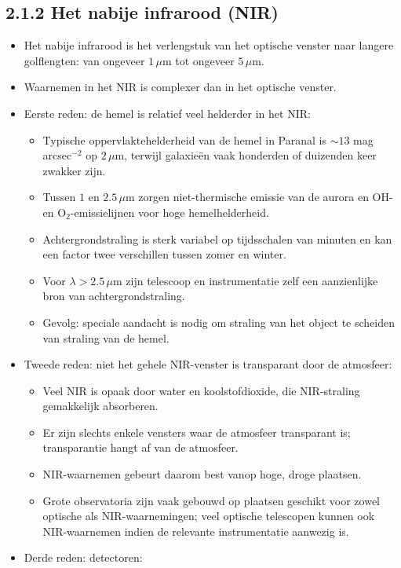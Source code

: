 \documentclass[10pt,a4paper]{article}
\begin{document}
\subsection*{2.1.2 Het nabije infrarood (NIR)}
\begin{itemize}
  \item Het nabije infrarood  is het verlengstuk van het optische venster naar langere golflengten: van ongeveer $1\,\mu$m tot ongeveer $5\,\mu$m.
  \item Waarnemen in het NIR is complexer dan in het optische venster.
  \item Eerste reden: de hemel is relatief veel helderder in het NIR:
  \begin{itemize}
    \item Typische oppervlaktehelderheid van de hemel in Paranal is $\sim 13$ mag arcsec$^{-2}$ op $2\,\mu$m, terwijl galaxie\"en vaak honderden of duizenden keer zwakker zijn.
    \item Tussen $1$ en $2.5\,\mu$m zorgen niet-thermische emissie van de aurora en OH- en O$_2$-emissielijnen voor hoge hemelhelderheid.
    \item Achtergrondstraling is sterk variabel op tijdsschalen van minuten en kan een factor twee verschillen tussen zomer en winter.
    \item Voor $\lambda > 2.5\,\mu$m zijn telescoop en instrumentatie zelf een aanzienlijke bron van achtergrondstraling.
    \item Gevolg: speciale aandacht is nodig om straling van het object te scheiden van straling van de hemel.
  \end{itemize}
  \item Tweede reden: niet het gehele NIR-venster is transparant door de atmosfeer:
  \begin{itemize}
    \item Veel NIR is opaak door water en koolstofdioxide, die NIR-straling gemakkelijk absorberen.
    \item Er zijn slechts enkele vensters waar de atmosfeer transparant is; transparantie hangt af van de atmosfeer.
    \item NIR-waarnemen gebeurt daarom best vanop hoge, droge plaatsen.
    \item Grote observatoria zijn vaak gebouwd op plaatsen geschikt voor zowel optische als NIR-waarnemingen; veel optische telescopen kunnen ook NIR-waarnemen indien de relevante instrumentatie aanwezig is.
  \end{itemize}
  \item Derde reden: detectoren:

\end{itemize}
\end{document}
